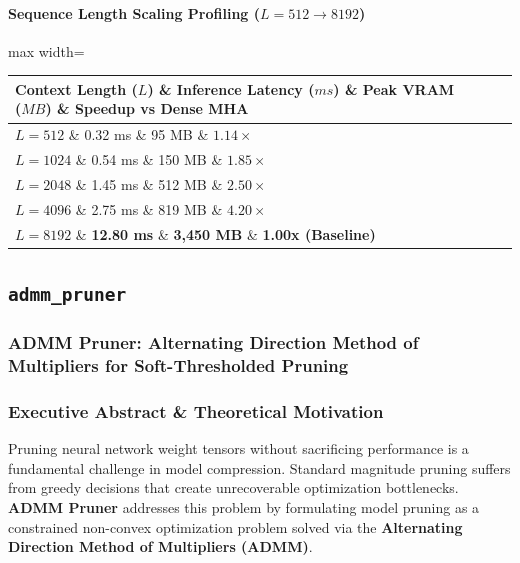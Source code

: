 \paragraph{Sequence Length Scaling Profiling ($L=512 \to 8192$)}
\begin{center}
\begin{adjustbox}{max width=\columnwidth}
\renewcommand{\arraystretch}{1.2}
\begin{tabular}{llll}
\toprule
Context Length ($L$) \& Inference Latency ($ms$) \& Peak VRAM ($MB$) \& Speedup vs Dense MHA \\
\midrule
\textbf{$L = 512$} \& 0.32 ms \& 95 MB \& $1.14\times$ \\
\textbf{$L = 1024$} \& 0.54 ms \& 150 MB \& $1.85\times$ \\
\textbf{$L = 2048$} \& 1.45 ms \& 512 MB \& $2.50\times$ \\
\textbf{$L = 4096$} \& 2.75 ms \& 819 MB \& $4.20\times$ \\
\textbf{$L = 8192$} \& \textbf{12.80 ms} \& \textbf{3,450 MB} \& \textbf{1.00x (Baseline)} \\


\bottomrule
\end{tabular}
\end{adjustbox}
\end{center}

\subsection{\texttt{admm\_pruner}}
\subsubsection*{ADMM Pruner: Alternating Direction Method of Multipliers for Soft-Thresholded Pruning}

\subsubsection*{Executive Abstract \& Theoretical Motivation}

Pruning neural network weight tensors without sacrificing performance is a fundamental challenge in model compression. Standard magnitude pruning suffers from greedy decisions that create unrecoverable optimization bottlenecks. \textbf{ADMM Pruner} addresses this problem by formulating model pruning as a constrained non-convex optimization problem solved via the \textbf{Alternating Direction Method of Multipliers (ADMM)}.

